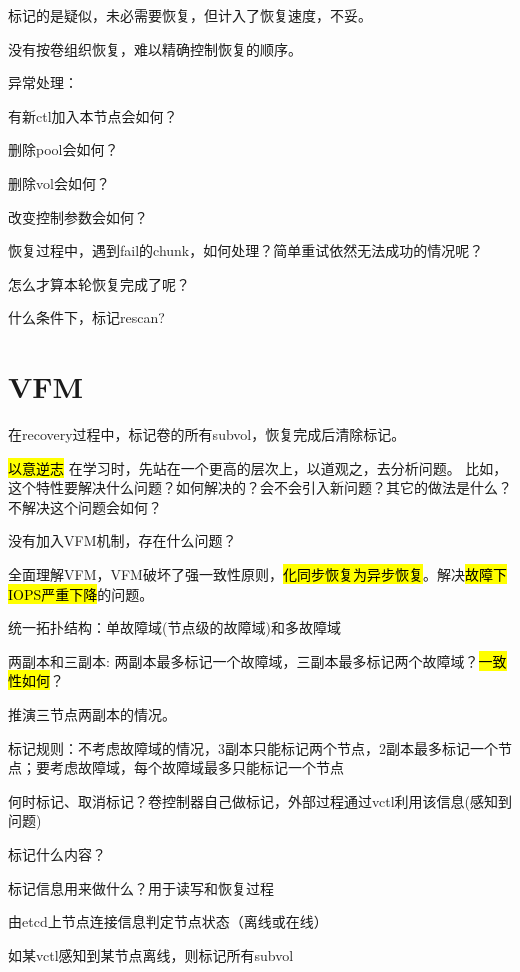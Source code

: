 标记的是疑似，未必需要恢复，但计入了恢复速度，不妥。

没有按卷组织恢复，难以精确控制恢复的顺序。

异常处理：
\begin{enumbox}
\item 有新ctl加入本节点会如何？
\item 删除pool会如何？
\item 删除vol会如何？
\item 改变控制参数会如何？
\item 恢复过程中，遇到fail的chunk，如何处理？简单重试依然无法成功的情况呢？
\item 怎么才算本轮恢复完成了呢？
\item 什么条件下，标记rescan?
\end{enumbox}

\section{VFM}

在recovery过程中，标记卷的所有subvol，恢复完成后清除标记。

\hl{以意逆志} 在学习时，先站在一个更高的层次上，以道观之，去分析问题。
比如，这个特性要解决什么问题？如何解决的？会不会引入新问题？其它的做法是什么？
不解决这个问题会如何？

没有加入VFM机制，存在什么问题？

全面理解VFM，VFM破坏了强一致性原则，\hl{化同步恢复为异步恢复}。解决\hl{故障下IOPS严重下降}的问题。

统一拓扑结构：单故障域(节点级的故障域)和多故障域

两副本和三副本: 两副本最多标记一个故障域，三副本最多标记两个故障域？\hl{一致性如何}？

推演三节点两副本的情况。

\begin{enumbox}
\item 标记规则：不考虑故障域的情况，3副本只能标记两个节点，2副本最多标记一个节点；要考虑故障域，每个故障域最多只能标记一个节点
\item 何时标记、取消标记？卷控制器自己做标记，外部过程通过vctl利用该信息(感知到问题)
\item 标记什么内容？
\item 标记信息用来做什么？用于读写和恢复过程
\item *
\item 由etcd上节点连接信息判定节点状态（离线或在线）
\item 如某vctl感知到某节点离线，则标记所有subvol
\end{enumbox}

